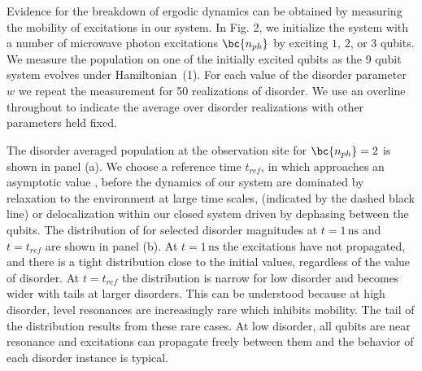 
Evidence for the breakdown of ergodic dynamics can be obtained by measuring the mobility of excitations in our system.
In Fig. 2, we initialize the system with a number of microwave photon excitations $\bc{n_{ph}}$  by exciting $1$, $2$, or $3$ qubits.
We measure the population on one of the initially excited qubits as the 9 qubit system evolves under Hamiltonian~(1).
For each value of the disorder parameter $w$ we repeat the measurement for 50 realizations of disorder.
We use an overline throughout to indicate the average over disorder realizations with other parameters held fixed.

The disorder averaged population at the observation site \bc{$\overline{\nqninet}$} for $\bc{n_{ph}}=2$ is shown in panel (a).
We choose a reference time $t_{ref}$, in which \bc{$\overline{ \nqninet }$} approaches an asymptotic value ,
before the dynamics of our system are dominated by relaxation to the environment at large time scales, (indicated by the dashed black line)
or delocalization within our closed system driven by dephasing between the qubits\autocite{supplement,Znidaric2015, Levi2016, Fischer2016, Luschen2017, vanNieuwenburg2017}.
The distribution of \bc{$\nqninet$} for selected disorder magnitudes at $t=1\,\text{ns}$ and $t=t_{ref}$ are shown in panel (b).
At $t=1\,\text{ns}$ the excitations have not propagated, and there is a tight distribution close to the initial values, regardless of the value of disorder.
At $t=t_{ref}$ the distribution is narrow for low disorder and becomes wider with tails at larger disorders.
This can be understood because at high disorder, level resonances are increasingly rare which inhibits mobility.
The tail of the distribution results from these rare cases.
At low disorder, all qubits are near resonance and excitations can propagate freely between them and the behavior of each disorder instance is typical.

